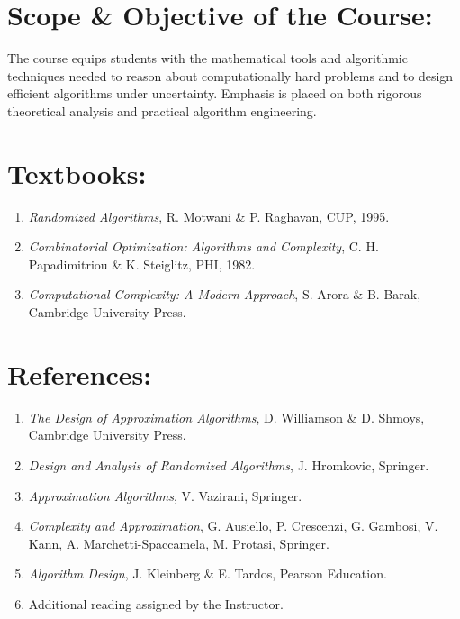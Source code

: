 \documentclass[11pt,letterpaper]{article}
\begin{document}
\begin{sf}
\section{Scope \& Objective of the Course:}
The course equips students with the mathematical tools and algorithmic techniques needed to reason about computationally hard problems and to design efficient algorithms under uncertainty. Emphasis is placed on both rigorous theoretical analysis and practical algorithm engineering.

\section{Textbooks:}
\begin{enumerate}[label=\bfseries{ T{\arabic*}.}, 
                leftmargin=2cm]
\item  \textit{Randomized Algorithms}, R. Motwani \& P. Raghavan, CUP, 1995.
\item  \textit{Combinatorial Optimization: Algorithms and Complexity}, C. H. Papadimitriou \& K. Steiglitz, PHI, 1982.
\item  \textit{Computational Complexity: A Modern Approach}, S. Arora \& B. Barak, Cambridge University Press.
\end{enumerate}
\section*{  References:}
\begin{enumerate}[label=\bfseries{R{\arabic*}.}, 
                leftmargin=2cm]
\item  \textit{The Design of Approximation Algorithms}, D. Williamson \& D. Shmoys, Cambridge University Press.
\item  \textit{Design and Analysis of Randomized Algorithms}, J. Hromkovic, Springer.
\item  \textit{Approximation Algorithms}, V. Vazirani, Springer.
\item  \textit{Complexity and Approximation}, G. Ausiello, P. Crescenzi, G. Gambosi, V. Kann, A. Marchetti-Spaccamela, M. Protasi, Springer.
\item  \textit{Algorithm Design}, J. Kleinberg \& E. Tardos, Pearson Education.
\item  Additional reading assigned by the Instructor.
\end{enumerate}


\end{sf}
\end{document}
